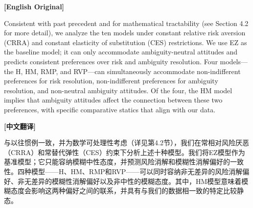 \documentclass[12pt,a4paper]{ctexart}
\newenvironment{original}{%
  \par\medskip\noindent\textbf{[English Original]}\par\smallskip
  \color{black}\small
}{%
  \par\medskip
}
\newenvironment{translation}{%
  \par\noindent\textbf{[中文翻译]}\par\smallskip
  \color{blue}\small
}{%
  \par\bigskip
}
\theoremstyle{definition}
\theoremstyle{remark}
\begin{document}
\begin{original}
Consistent with past precedent and for mathematical tractability (see Section 4.2 for more detail), we analyze the ten models under constant relative risk aversion (CRRA) and constant elasticity of substitution (CES) restrictions. We use EZ as the baseline model; it can only accommodate ambiguity-neutral attitudes and predicts consistent preferences over risk and ambiguity resolution. Four models---the H, HM, RMP, and RVP---can simultaneously accommodate non-indifferent preferences for risk resolution, non-indifferent preferences for ambiguity resolution, and non-neutral ambiguity attitudes. Of the four, the HM model implies that ambiguity attitudes affect the connection between these two preferences, with specific comparative statics that align with our data.
\end{original}
\begin{translation}
与以往惯例一致，并为数学可处理性考虑（详见第4.2节），我们在常相对风险厌恶（CRRA）和常替代弹性（CES）约束下分析上述十种模型。我们将EZ模型作为基准模型；它只能容纳模糊中性态度，并预测风险消解和模糊性消解偏好的一致性。四种模型——H、HM、RMP和RVP——可以同时容纳非无差异的风险消解偏好、非无差异的模糊性消解偏好以及非中性的模糊态度。其中，HM模型意味着模糊态度会影响这两种偏好之间的联系，并具有与我们的数据相一致的特定比较静态。
\end{translation}
\end{document}
